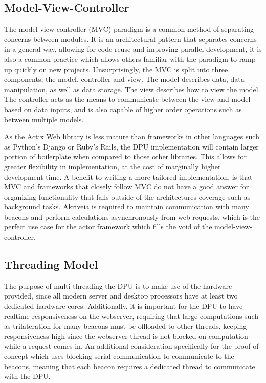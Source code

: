 \subsection{Model-View-Controller}
\medskip
The model-view-controller (MVC) paradigm is a common method of separating concerns between modules.
It is an architectural pattern that separates concerns in a general way, allowing for code reuse and improving parallel development, it is also a common practice which allows others familiar with the paradigm to ramp up quickly on new projects.
Unsurprisingly, the MVC is split into three components, the model, controller and view.
The model describes data, data manipulation, as well as data storage.
The view describes how to view the model.
The controller acts as the means to communicate between the view and model based on data inputs, and is also capable of higher order operations such as between multiple models.

\bigskip
As the Actix Web library is less mature than frameworks in other languages such as Python's Django or Ruby's Rails, the DPU implementation will contain larger portion of boilerplate when compared to those other libraries.
This allows for greater flexibility in implementation, at the cost of marginally higher development time.
A benefit to writing a more tailored implementation, is that MVC and frameworks that closely follow MVC do not have a good answer for organizing functionality that falls outside of the architectures coverage such as background tasks.
Akriveia is required to maintain communication with many beacons and perform calculations asynchronously from web requests, which is the perfect use case for the actor framework which fills the void of the model-view-controller.

\bigskip
\pagebreak
\subsection{Threading Model}
\medskip
The purpose of multi-threading the DPU is to make use of the hardware provided, since all modern server and desktop processors have at least two dedicated hardware cores.
Additionally, it is important for the DPU to have realtime responsiveness on the webserver, requiring that large computations such as trilateration for many beacons must be offloaded to other threads, keeping responsiveness high since the webserver thread is not blocked on computation while a request comes in.
An additional consideration specifically for the proof of concept which uses blocking serial communication to communicate to the beacons, meaning that each beacon requires a dedicated thread to communicate with the DPU.

